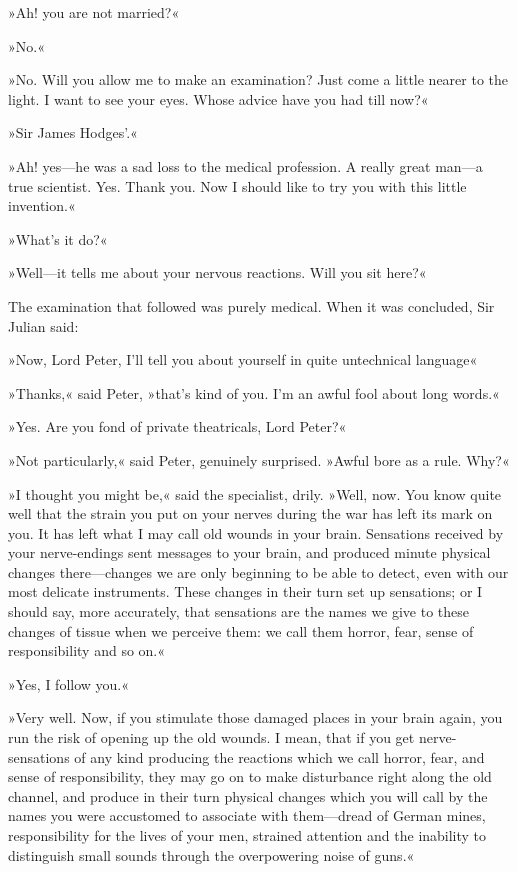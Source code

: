 »Ah! you are not married?«

»No.«

»No. Will you allow me to make an examination? Just come a little nearer to the light. I want to see your eyes. Whose advice have you had till now?«

»Sir James Hodges'.«

»Ah! yes\allowbreak---\allowbreak he was a sad loss to the medical profession. A really great man\allowbreak---\allowbreak a true scientist. Yes. Thank you. Now I should like to try you with this little invention.«

»What's it do?«

»Well\allowbreak---\allowbreak it tells me about your nervous reactions. Will you sit here?«

The examination that followed was purely medical. When it was concluded, Sir Julian said:

»Now, Lord Peter, I'll tell you about yourself in quite untechnical language\longdash«

»Thanks,« said Peter, »that's kind of you. I'm an awful fool about long words.«

»Yes. Are you fond of private theatricals, Lord Peter?«

»Not particularly,« said Peter, genuinely surprised. »Awful bore as a rule. Why?«

»I thought you might be,« said the specialist, drily. »Well, now. You know quite well that the strain you put on your nerves during the war has left its mark on you. It has left what I may call old wounds in your brain. Sensations received by your nerve-endings sent messages to your brain, and produced minute physical changes there\allowbreak---\allowbreak changes we are only beginning to be able to detect, even with our most delicate instruments. These changes in their turn set up sensations; or I should say, more accurately, that sensations are the names we give to these changes of tissue when we perceive them: we call them horror, fear, sense of responsibility and so on.«

»Yes, I follow you.«

»Very well. Now, if you stimulate those damaged places in your brain again, you run the risk of opening up the old wounds. I mean, that if you get nerve-sensations of any kind producing the reactions which we call horror, fear, and sense of responsibility, they may go on to make disturbance right along the old channel, and produce in their turn physical changes which you will call by the names you were accustomed to associate with them\allowbreak---\allowbreak dread of German mines, responsibility for the lives of your men, strained attention and the inability to distinguish small sounds through the overpowering noise of guns.«

